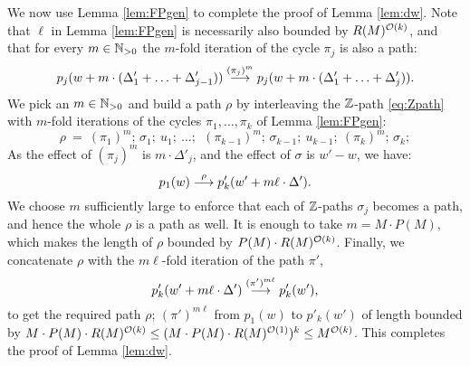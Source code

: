 \begin{appendixproof}
We now use Lemma \ref{lem:FPgen} to complete the proof of Lemma \ref{lem:dw}.
Note that $\ell$ in Lemma \ref{lem:FPgen} is necessarily also bounded by $R(M)^{{\cal O}(k)}$, and that
for every $m\in\mathbb{N}_{>0}$ the $m$-fold iteration of the cycle $\pi_j$ is also a path:
%
\begin{align}\label{eq:mfold}
p_j(w+m\cdot(\Delta'_1 + \ldots + \Delta'_{j-1})) \stackrel{(\pi_j)^m}{\longrightarrow} p_j(w+ m\cdot(\Delta'_1 + \ldots + \Delta'_{j})).
\end{align}
%
We pick an $m\in \mathbb{N}_{>0}$ and 
build a path $\rho$
by interleaving the $\mathbb{Z}$-path \eqref{eq:Zpath} with
$m$-fold iterations of the cycles $\pi_1, \ldots, \pi_k$ of Lemma \ref{lem:FPgen}:
\[
\rho \ = \ (\pi_1)^m;\, \sigma_1;\ u_1; \ \ldots; \ \ (\pi_{k-1})^m;\, \sigma_{k-1};\ u_{k-1}; \ (\pi_k)^m;\, \sigma_k;  %
\]
As the effect of $(\pi_j)^m$ is $m\cdot \Delta'_j$, and the effect of $\sigma$ is $w'-w$,
we have:
\[
p_1(w) \stackrel{\rho}{\longrightarrow} p'_k(w'+m\ell\cdot \Delta').
\]
We choose $m$ sufficiently large to enforce that each of $\mathbb{Z}$-paths $\sigma_j$
becomes a path, and hence the whole $\rho$ is a path as well.
It is enough to take 
 $m = M\cdot P(M)$, which
makes the length of $\rho$ bounded by $P(M) \cdot R(M)^{{\cal O}(k)}$.
%
%
Finally, we concatenate $\rho$ with the $m\ell$-fold iteration of the path $\pi'$,
\[
p'_k(w' + m\ell\cdot \Delta') \stackrel{(\pi')^{m\ell}}{\longrightarrow} p'_k(w'),
\]
to get the required path $\rho;\, (\pi')^{m\ell}$
from $p_1(w)$ to $p'_k(w')$
of length bounded by $M\cdot P(M) \cdot R(M)^{{\cal O}(k)} \leq
(M\cdot P(M)\cdot R(M)^{{\cal O}(1)})^k \leq M^{{\cal O}(k)}$.
%
This completes the proof of Lemma \ref{lem:dw}. %
\end{appendixproof}


